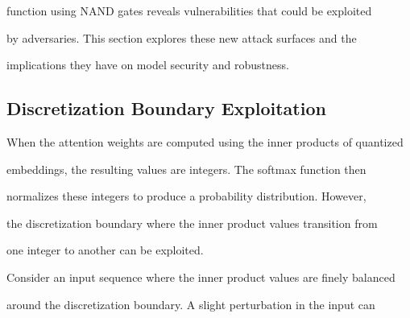 function using NAND gates reveals vulnerabilities that could be exploited






by adversaries. This section explores these new attack surfaces and the






implications they have on model security and robustness.













\subsection{Discretization Boundary Exploitation}













When the attention weights are computed using the inner products of quantized






embeddings, the resulting values are integers. The softmax function then






normalizes these integers to produce a probability distribution. However,






the discretization boundary where the inner product values transition from






one integer to another can be exploited.













Consider an input sequence where the inner product values are finely balanced






around the discretization boundary. A slight perturbation in the input can






